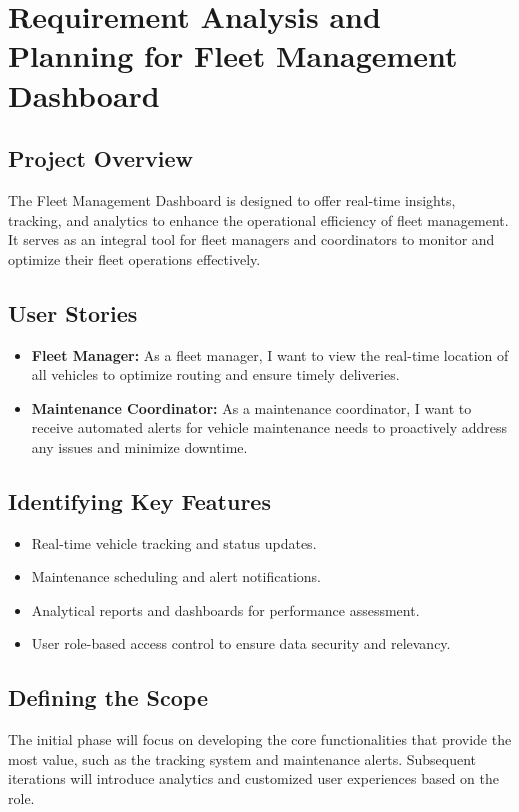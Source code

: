 \section*{Requirement Analysis and Planning for Fleet Management Dashboard}

\subsection*{Project Overview}
The Fleet Management Dashboard is designed to offer real-time insights, tracking, and analytics to enhance the operational efficiency of fleet management. It serves as an integral tool for fleet managers and coordinators to monitor and optimize their fleet operations effectively.

\subsection*{User Stories}
\begin{itemize}
    \item \textbf{Fleet Manager:} As a fleet manager, I want to view the real-time location of all vehicles to optimize routing and ensure timely deliveries.
    \item \textbf{Maintenance Coordinator:} As a maintenance coordinator, I want to receive automated alerts for vehicle maintenance needs to proactively address any issues and minimize downtime.
\end{itemize}

\subsection*{Identifying Key Features}
\begin{itemize}
    \item Real-time vehicle tracking and status updates.
    \item Maintenance scheduling and alert notifications.
    \item Analytical reports and dashboards for performance assessment.
    \item User role-based access control to ensure data security and relevancy.
\end{itemize}

\subsection*{Defining the Scope}
The initial phase will focus on developing the core functionalities that provide the most value, such as the tracking system and maintenance alerts. Subsequent iterations will introduce analytics and customized user experiences based on the role.

